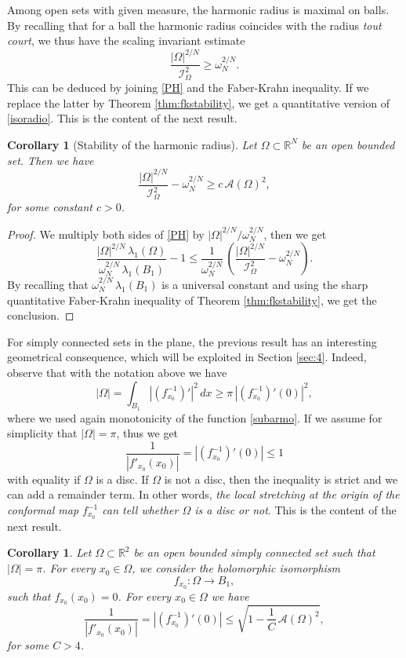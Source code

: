\documentclass{amsart}
\newtheorem{corollary}[lemma]{Corollary}
\theoremstyle{definition}
\numberwithin{equation}{section}
\begin{document}
Among open sets with given measure, the harmonic radius is maximal on balls. By recalling that for a ball the harmonic radius coincides with the radius {\it tout court}, we thus have the scaling invariant estimate
\begin{equation}
\label{isoradio}
\frac{|\Omega|^{2/N}}{\mathcal{I}_\Omega^2}\ge \omega_N^{2/N}.
\end{equation}
This can be deduced by joining \eqref{PH} and the Faber-Krahn inequality. If we replace the latter by Theorem \ref{thm:fkstability}, we get a quantitative version of \eqref{isoradio}. This is the content of the next result.
\begin{corollary}[Stability of the harmonic radius]
Let $\Omega\subset\mathbb{R}^N$ be an open bounded set. Then we have
\begin{equation}
\label{confra}
\frac{|\Omega|^{2/N}}{\mathcal{I}_\Omega^2}-\omega_N^{2/N}\ge c\,\mathcal{A}(\Omega)^2,
\end{equation}
for some constant $c>0$.
\end{corollary}
\begin{proof}
We multiply both sides of \eqref{PH} by $|\Omega|^{2/N}/\omega_N^{2/N}$, then we get
\[
\frac{|\Omega|^{2/N}\,\lambda_1(\Omega)}{\omega_N^{2/N}\,\lambda_1(B_1)}-1\le \frac{1}{\omega_N^{2/N}}\,\left(\frac{|\Omega|^{2/N}}{\mathcal{I}_\Omega^2}-\omega_N^{2/N}\right).
\]
By recalling that $\omega_N^{2/N}\,\lambda_1(B_1)$ is a universal constant and using the sharp quantitative Faber-Krahn inequality of Theorem \ref{thm:fkstability}, we get the conclusion.
\end{proof}
For simply connected sets in the plane, the previous result has an interesting geometrical consequence, which will be exploited in Section \ref{sec:4}. Indeed, observe that with the notation above we have 
\[
|\Omega|=\int_{B_1} |(f^{-1}_{x_0})'|^2\,dx\ge \pi\,|(f^{-1}_{x_0})'(0)|^2,
\]
where we used again monotonicity of the function \eqref{subarmo}.
If we assume for simplicity that $|\Omega|=\pi$, thus we get
\[
\frac{1}{|f'_{x_0}(x_0)|}=|(f^{-1}_{x_0})'(0)|\le 1
\]
with equality if $\Omega$ is a disc. If $\Omega$ is not a disc, then the inequality is strict and we can add a remainder term. In other words, {\it the local stretching at the origin of the conformal map $f^{-1}_{x_0}$ can tell whether $\Omega$ is a disc or not}.
This is the content of the next result.
\begin{corollary}
\label{lm:kindof}
Let $\Omega\subset\mathbb{R}^2$ be an open bounded simply connected set such that $|\Omega|=\pi$. For every $x_0\in\Omega$, we consider the holomorphic isomorphism
\[
f_{x_0}:\Omega\to B_1,
\] 
such that $f_{x_0}(x_0)=0$. For every $x_0\in\Omega$ we have
\[
\frac{1}{|f'_{x_0}(x_0)|}=|(f_{x_0}^{-1})'(0)|\le \sqrt{1-\frac{1}{C}\, \mathcal{A}(\Omega)^2},
\]
for some $C>4$.
\end{corollary}
\end{document}
